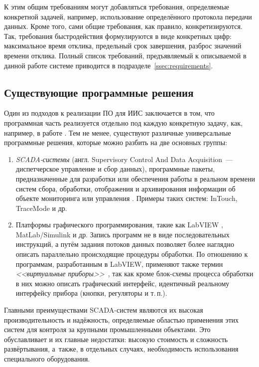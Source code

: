 \documentclass[a4paper, 14pt, titlepage]{extarticle}
\newcommand{\term}[1]{\emph{#1}}
\begin{document}
  К этим общим требованиям могут добавляться требования, определяемые конкретной задачей, например,
  использование определённого протокола передачи данных. Кроме того, сами общие требования, как
  правило, конкретизируются. Так, требования быстродействия формулируются в виде конкретных цифр:
  максимальное время отклика, предельный срок завершения, разброс значений времени отклика.
  Полный список требований, предъявляемый к описываемой в данной работе системе приводится в
  подразделе~\ref{ssec:requirements}.

  \subsection{Существующие программные решения}\label{ssec:existing}

  Один из подходов к реализации ПО для ИИС заключается в том, что программная часть реализуется отдельно под
  каждую конкретную задачу, как, например, в работе \cite{bak-autometry}.
  Тем не менее, существуют различные универсальные программные решения, которые можно разбить на две
  основных группы:
  \begin{enumerate}
    \item \term{SCADA-системы} (англ. Supervisory Control And Data Acquisition~--- диспетчерское управление и
      сбор данных), программные пакеты, предназначенные для разработки или обеспечения работы в
      реальном времени систем сбора, обработки, отображения и архивирования информации об объекте
      мониторинга или управления \cite{boyer-scada}.
      Примеры таких систем: InTouch, TraceMode и др.
    \item Платформы графического программирования, такие как LabVIEW \cite{lavrov-labview}, MatLab/Simulink и др.
      Запись программ не в виде последовательных инструкций, а путём задания потоков
      данных позволяет более наглядно описать параллельно происходящие процедуры обработки.
      По отношению к программам, разработанным в LabVIEW, применяют также термин \term{<<виртуальные приборы>>}~\cite[с.~209]{rannev-iis},
      так как кроме блок-схемы процесса обработки в них можно описать графический интерфейс,
      идентичный реальному интерфейсу прибора (кнопки, регуляторы и т.\,п.).
  \end{enumerate}

  Главными преимуществами SCADA-систем являются их высокая производительность и надёжность,
  определяемые областью применения этих систем для контроля за крупными промышленными объектами.
  Это обуславливает и их главные недостатки: высокую стоимость и сложность развёртывания, а~также, в отдельных
  случаях, необходимость использования специального оборудования.
\end{document}
